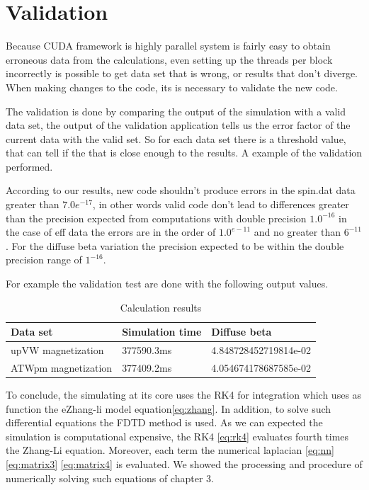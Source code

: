 \section{Validation}

Because CUDA framework is highly parallel system is fairly easy to obtain erroneous data from the calculations, even setting up the threads per block incorrectly is possible to get data set that is wrong, or results that don't diverge. When making changes to the code, its is necessary to validate the new code.

The validation is done by comparing the output of the simulation with a valid data set, the output of the validation application tells us the error factor of the current data with the valid set. So for each data set there is a threshold value, that can tell if the that is close enough to the results. A example of the validation performed.

According to our results, new code shouldn't produce errors in the spin.dat data 
greater than $7.0e^{-17}$, in other words valid code don't lead to differences greater than
the precision expected from computations with double precision $1.0^{-16}$ in the case of eff data the errors are in the order of $1.0^{e-11}$ and no greater than $6^{-11}$. For the diffuse beta variation the precision expected to be within the double precision range of $1^{-16}$. 

For example the validation test are done with the following output values.

\begin{table}[h]
\centering
\begin{tabular}{| l | l | l |}
\hline
Data set & Simulation time & Diffuse beta  \\
\hline
upVW magnetization & 377590.3ms & 4.848728452719814e-02 \\
\hline
ATWpm magnetization & 377409.2ms & 4.054674178687585e-02 \\
\hline
\end{tabular}
\caption{Calculation results}
\label{tab:results}
\end{table}


\vspace{3.5em}

To conclude, the simulating at its core uses the RK4 for integration which uses as function the eZhang-li model equation\ref{eq:zhang}. In addition, to solve such differential equations the FDTD method is used. As we can expected the simulation is computational expensive, the RK4 \ref{eq:rk4} evaluates fourth times the Zhang-Li equation. Moreover, each term the numerical laplacian \ref{eq:nn} \ref{eq:matrix3} \ref{eq:matrix4} is evaluated. We showed the processing and procedure of numerically solving such equations of chapter 3.



